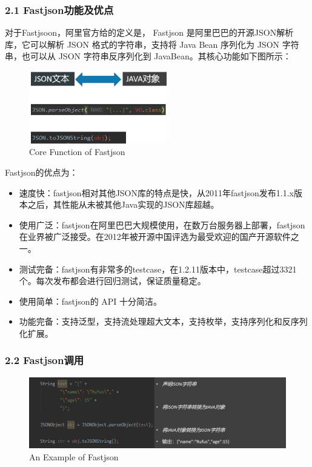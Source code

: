 \documentclass{article}
\begin{document}
\subsubsection*{2.1 Fastjson功能及优点}
对于Fastjsoon，阿里官方给的定义是， Fastjson 是阿里巴巴的开源JSON解析库，它可以解析 JSON 格式的字符串，支持将 Java Bean 序列化为 JSON 字符串，也可以从 JSON 字符串反序列化到 JavaBean。其核心功能如下图所示：
\begin{figure}[H]
\centering %
\includegraphics[width = 6cm]{pic4.png}
\caption{Core Function of Fastjson}
\end{figure}
Fastjson的优点为：
\begin{itemize}%
\item 速度快：fastjson相对其他JSON库的特点是快，从2011年fastjson发布1.1.x版本之后，其性能从未被其他Java实现的JSON库超越。
\item 使用广泛：fastjson在阿里巴巴大规模使用，在数万台服务器上部署，fastjson在业界被广泛接受。在2012年被开源中国评选为最受欢迎的国产开源软件之一。
\item 测试完备：fastjson有非常多的testcase，在1.2.11版本中，testcase超过3321 个。每次发布都会进行回归测试，保证质量稳定。
\item 使用简单：fastjson的 API 十分简洁。
\item 功能完备：支持泛型，支持流处理超大文本，支持枚举，支持序列化和反序列化扩展。
\end{itemize}


\subsubsection*{2.2	Fastjson调用}
\begin{figure}[H]
\centering %
\includegraphics[width =18cm]{pic5.png}
\caption{An Example of Fastjson}
\end{figure}
\end{document}
